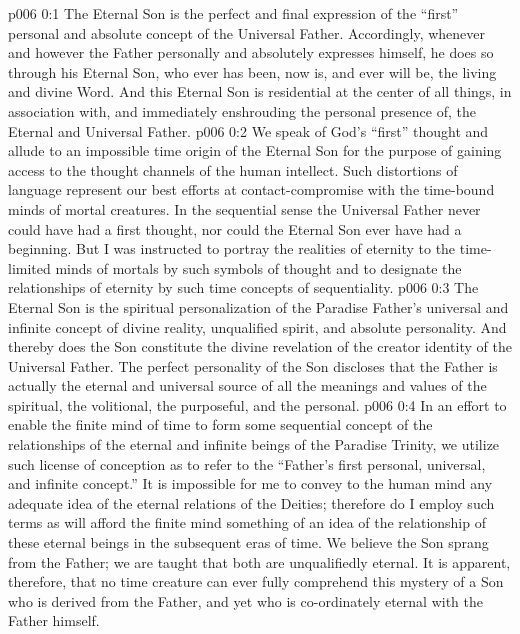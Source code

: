 \author{Divine Counselor}
\vs p006 0:1 The Eternal Son is the perfect and final expression of the “first” personal and absolute concept of the Universal Father. Accordingly, whenever and however the Father personally and absolutely expresses himself, he does so through his Eternal Son, who ever has been, now is, and ever will be, the living and divine Word. And this Eternal Son is residential at the center of all things, in association with, and immediately enshrouding the personal presence of, the Eternal and Universal Father.
\vs p006 0:2 We speak of God’s “first” thought and allude to an impossible time origin of the Eternal Son for the purpose of gaining access to the thought channels of the human intellect. Such distortions of language represent our best efforts at contact\hyp{}compromise with the time\hyp{}bound minds of mortal creatures. In the sequential sense the Universal Father never could have had a first thought, nor could the Eternal Son ever have had a beginning. But I was instructed to portray the realities of eternity to the time\hyp{}limited minds of mortals by such symbols of thought and to designate the relationships of eternity by such time concepts of sequentiality.
\vs p006 0:3 The Eternal Son is the spiritual personalization of the Paradise Father’s universal and infinite concept of divine reality, unqualified spirit, and absolute personality. And thereby does the Son constitute the divine revelation of the creator identity of the Universal Father. The perfect personality of the Son discloses that the Father is actually the eternal and universal source of all the meanings and values of the spiritual, the volitional, the purposeful, and the personal.\plusone
\vs p006 0:4 In an effort to enable the finite mind of time to form some sequential concept of the relationships of the eternal and infinite beings of the Paradise Trinity, we utilize such license of conception as to refer to the “Father’s first personal, universal, and infinite concept.” It is impossible for me to convey to the human mind any adequate idea of the eternal relations of the Deities; therefore do I employ such terms as will afford the finite mind something of an idea of the relationship of these eternal beings in the subsequent eras of time. We believe the Son sprang from the Father; we are taught that both are unqualifiedly eternal. It is apparent, therefore, that no time creature can ever fully comprehend this mystery of a Son who is derived from the Father, and yet who is co\hyp{}ordinately eternal with the Father himself.
